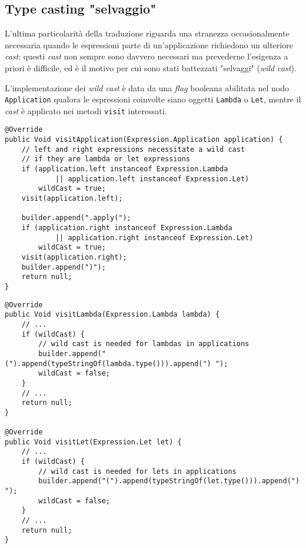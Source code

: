 \subsection{Type casting "selvaggio"}
\label{sec:5-15-wild-type-casting}

L'ultima particolarità della traduzione riguarda una stranezza occasionalmente necessaria quando
le espressioni parte di un'applicazione richiedono un ulteriore \textit{cast}: questi \textit{cast} non sempre sono davvero necessari
ma prevederne l'esigenza a priori è difficile, ed è il motivo per cui sono stati battezzati "selvaggi" (\textit{wild cast}).


L'implementazione dei \textit{wild cast} è data da una \textit{flag} booleana abilitata nel nodo \texttt{Application}
qualora le espressioni coinvolte siano oggetti \texttt{Lambda} o \texttt{Let}, mentre il \textit{cast} è applicato
nei metodi \texttt{visit} interessati.

\vspace{4mm}
\begin{lstlisting}[caption={Metodo \texttt{visit} per le applicazioni di funzione}, style=javaCode, label={lst:5-15-visit-application-java}]
@Override
public Void visitApplication(Expression.Application application) {
    // left and right expressions necessitate a wild cast
    // if they are lambda or let expressions
    if (application.left instanceof Expression.Lambda
            || application.left instanceof Expression.Let)
        wildCast = true;
    visit(application.left);

    builder.append(".apply(");
    if (application.right instanceof Expression.Lambda
            || application.right instanceof Expression.Let)
        wildCast = true;
    visit(application.right);
    builder.append(")");
    return null;
}
\end{lstlisting}
\vspace{4mm}
\begin{lstlisting}[caption={\textit{Wild cast} in espressioni \texttt{lambda} e \texttt{let}}, style=javaCode, label={lst:5-15-wild-casts-java}]
@Override
public Void visitLambda(Expression.Lambda lambda) {
    // ...
    if (wildCast) {
        // wild cast is needed for lambdas in applications
        builder.append("(").append(typeStringOf(lambda.type())).append(") ");
        wildCast = false;
    }
    // ...
    return null;
}

@Override
public Void visitLet(Expression.Let let) {
    // ...
    if (wildCast) {
        // wild cast is needed for lets in applications
        builder.append("(").append(typeStringOf(let.type())).append(") ");
        wildCast = false;
    }
    // ...
    return null;
}
\end{lstlisting}

